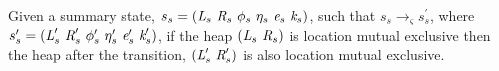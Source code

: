 %

\begin{theorem}
\label{thm:mutex}
Given a summary state, $s_s = ( \cfgnt{L}_s\ \cfgnt{R}_s\ \phi_s\ \eta_s\ \cfgnt{e}_s\ \cfgnt{k}_s )$, such that $s_s \rightarrow_\varsigma s_s^\prime$, where $s_s^\prime = ( \cfgnt{L}_s^\prime\ \cfgnt{R}_s^\prime\ \phi_s^\prime\ \eta_s^\prime\ \cfgnt{e}_s^\prime\ \cfgnt{k}_s^\prime )$, if the heap $(\emph{L}_s\ \emph{R}_s)$ is location mutual exclusive then the heap after the transition, $(\emph{L}_s^\prime\ \emph{R}_s^\prime)$ is also location mutual exclusive.
\begin{comment}
If we have a reachable summary state $s_s = ( \cfgnt{L}_s\ \cfgnt{R}_s\ \phi_s\ \eta_s\ \cfgnt{e}_s\ \cfgnt{k}_s )$, then for any reference $r \in \cfgnt{L}_s^\leftarrow$
$$ 
\begin{array}{l}
\forall (\phi_\alpha\ \cfgnt{l}_\alpha) \in \cfgnt{L}_s(\cfgnt{r})\ (\forall (\phi_\beta\ \cfgnt{l}_\beta) \in \cfgnt{L}_s(\cfgnt{r})\ ( \\
\ \ \ \ (\cfgnt{l}_\alpha \neq \cfgnt{l}_\beta) \Rightarrow ((\phi_\alpha \wedge \phi_\beta) = \cfgt{false})))
\end{array}
$$
\end{comment}
\end{theorem}
